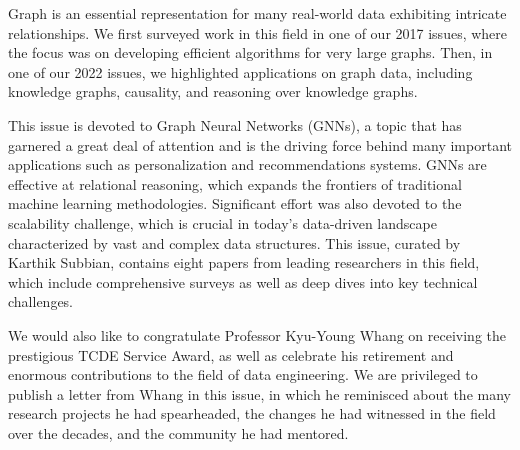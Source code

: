 \documentclass[11pt]{article}
\begin{document}
Graph is an essential representation for many real-world data exhibiting intricate relationships. We first surveyed work in this field in one of our 2017 issues, where the focus was on developing efficient algorithms for very large graphs. Then, in one of our 2022 issues, we highlighted applications on graph data, including knowledge graphs, causality, and reasoning over knowledge graphs.

This issue is devoted to Graph Neural Networks (GNNs), a topic that has garnered a great deal of attention and is the driving force behind many important applications such as personalization and recommendations systems. GNNs are effective at relational reasoning, which expands the frontiers of traditional machine learning methodologies. Significant effort was also devoted to the scalability challenge, which is crucial in today's data-driven landscape characterized by vast and complex data structures. This issue, curated by Karthik Subbian, contains eight papers from leading researchers in this field, which include comprehensive surveys as well as deep dives into key technical challenges.

We would also like to congratulate Professor Kyu-Young Whang on receiving the prestigious TCDE Service   Award, as well as celebrate his retirement and enormous contributions to the field of data engineering. We are privileged to publish a letter from Whang in this issue, in which he reminisced about the many research projects he had spearheaded, the changes he had witnessed in the field over the decades, and the community he had mentored.
\end{document}
